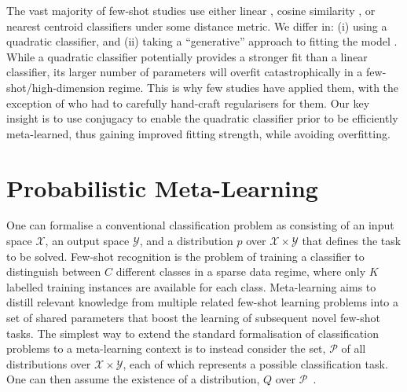 \documentclass[10pt,twocolumn,letterpaper]{article}
\begin{document}
 The vast majority of few-shot studies use either linear \cite{mangla2020charting,gordon2019metaPred,dvornik2020selecting}, cosine similarity \cite{qiao2017few}, or nearest centroid classifiers \cite{wang2019simpleshot,snell2017prototypical} under some distance metric. We differ in: (i) using a quadratic classifier, and (ii) taking a ``generative'' approach to fitting the model \cite{hastie2009elements}. While a quadratic classifier potentially provides a stronger fit than a linear classifier, its larger number of parameters will overfit catastrophically in a few-shot/high-dimension regime. This is why few studies have applied them, with the exception of \cite{bateni2020improved} who had to carefully hand-craft regularisers for them. Our key insight is to use conjugacy to enable the quadratic classifier prior to be efficiently meta-learned, thus gaining improved fitting strength, while avoiding overfitting.

\section{Probabilistic Meta-Learning}
\label{sec:probabilistic-meta-learning}
One can formalise a conventional classification problem as consisting of an input space $\mathcal{X}$, an output space $\mathcal{Y}$, and a distribution $p$ over $\mathcal{X} \times \mathcal{Y}$ that defines the task to be solved. Few-shot recognition is the problem of training a classifier to distinguish between $C$ different classes in a sparse data regime, where only $K$ labelled training instances are available for each class. Meta-learning aims to distill relevant knowledge from multiple related few-shot learning problems into a set of shared parameters that boost the learning of subsequent novel few-shot tasks. The simplest way to extend the standard formalisation of classification problems to a meta-learning context is to instead consider the set, $\mathcal{P}$ of all distributions over $\mathcal{X} \times \mathcal{Y}$, each of which represents a possible classification task. One can then assume the existence of a distribution, $Q$ over $\mathcal{P}$~\cite{baxter2000model}.
\end{document}
